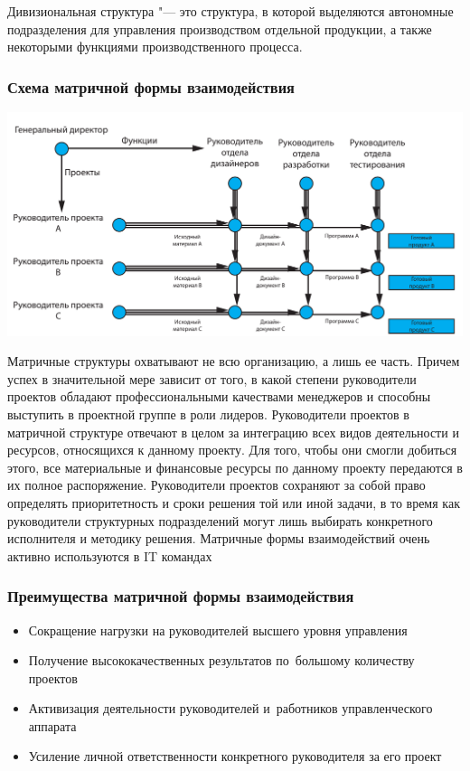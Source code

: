 \documentclass{../industrial-development}
\begin{document}
Дивизиональная структура "--- это структура, в которой выделяются автономные подразделения для управления производством отдельной продукции, а также некоторыми функциями производственного процесса.

\begin{frame} \frametitle{Схема матричной формы взаимодействия}

\begin{block}{}
	\centerline{\includegraphics[width=1\textwidth]{matrix.pdf}}
\end{block}

\end{frame}

\lecturenotes
Матричные структуры охватывают не всю организацию, а лишь ее часть. Причем успех в значительной мере зависит от того, в какой степени руководители проектов обладают профессиональными качествами менеджеров и способны выступить в проектной группе в роли лидеров.
Руководители проектов в матричной структуре отвечают в целом за интеграцию всех видов деятельности и ресурсов, относящихся к данному проекту. Для того, чтобы они смогли добиться этого, все материальные и финансовые ресурсы по данному проекту передаются в их полное распоряжение. Руководители проектов сохраняют за собой право определять приоритетность и сроки решения той или иной задачи, в то время как руководители структурных подразделений могут лишь выбирать конкретного исполнителя и методику решения.
Матричные формы взаимодействий очень активно используются в IT  командах

\begin{frame} \frametitle{Преимущества матричной формы взаимодействия}
  
	\begin{itemize}
		\item Сокращение нагрузки на руководителей высшего уровня управления 
		\item Получение высококачественных результатов по~большому количеству проектов
		\item Активизация деятельности руководителей и~работников управленческого аппарата
		\item Усиление личной ответственности конкретного руководителя за его проект
	\end{itemize}
\end{frame}
\end{document}
